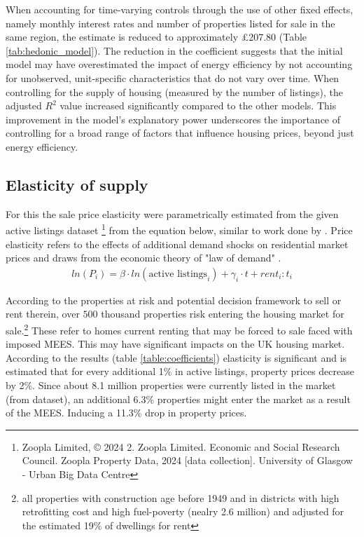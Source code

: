 

When accounting for time-varying controls through the use of other fixed effects, namely monthly interest rates and number of properties listed for sale in the same region, the estimate is reduced to approximately £207.80 (Table \ref{tab:hedonic_model}). The reduction in the coefficient suggests that the initial model may have overestimated the impact of energy efficiency by not accounting for unobserved, unit-specific characteristics that do not vary over time. When controlling for the supply of housing (measured by the number of listings), the adjusted $R^2$ value increased significantly compared to the other models. This improvement in the model's explanatory power underscores the importance of controlling for a broad range of factors that influence housing prices, beyond just energy efficiency. \\


\subsection{Elasticity of supply}
For this the sale price elasticity were parametrically estimated from the given active listings dataset \footnote{Zoopla Limited, © 2024 2. Zoopla Limited. Economic and Social Research Council. Zoopla Property Data, 2024 [data collection]. University of Glasgow - Urban Big Data Centre} from the equation below, similar to work done by \cite{malpezzi_long-run_2001}. Price elasticity refers to the effects of additional demand shocks on residential market prices and draws from the economic theory of "law of demand" \cite{fibich_dynamics_2005}.
\begin{align*}
    ln(P_i) = \beta \cdot ln(\text{active listings}_i) + \gamma_i \cdot t + rent_i : t_i
\end{align*}

According to the properties at risk and potential decision framework to sell or rent therein, over $500$ thousand properties risk entering the housing market for sale.\footnote{all properties with construction age before 1949 and in districts with high retrofitting cost and high fuel-poverty (nealry 2.6 million) and adjusted for the estimated 19\% of dwellings for rent} These refer to homes current renting that may be forced to sale faced with imposed MEES. This may have significant impacts on the UK housing market. According to the results (table \ref{table:coefficients}) elasticity is significant and is estimated that for every additional 1\% in active listings, property prices decrease by 2\%. Since about 8.1 million properties were currently listed in the market (from dataset), an additional 6.3\% properties might enter the market as a result of the MEES. Inducing a 11.3\% drop in property prices.


